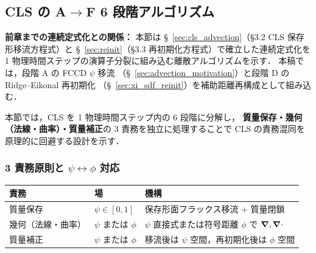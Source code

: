 %
%
\subsection{\texorpdfstring{CLS の A$\to$F 6 段階アルゴリズム}{CLS の A→F 6 段階アルゴリズム}}
\label{sec:cls_stages}

\noindent\textbf{前章までの連続定式化との関係：}
本節は §~\ref{sec:cls_advection}（§3.2 CLS 保存形移流方程式）と
§~\ref{sec:reinit}（§3.3 再初期化方程式）で確立した連続定式化を
1 物理時間ステップの演算子分裂に組み込む離散アルゴリズムを示す．
本稿では，段階 A の FCCD $\psi$ 移流
（§~\ref{sec:advection_motivation}）と段階 D の Ridge--Eikonal 再初期化
（§~\ref{sec:xi_sdf_reinit}）を補助距離再構成として組み込む．

本節では，CLS \cite{OlssonKreiss2005} を 1 物理時間ステップ内の
6 段階に分解し，
\textbf{質量保存・幾何（法線・曲率）・質量補正}の
3 責務を独立に処理することで
CLS の責務混同を原理的に回避する設計を示す．

\subsubsection{\texorpdfstring{3 責務原則と $\psi\leftrightarrow\phi$ 対応}{3 責務原則と ψ↔φ 対応}}
\label{sec:cls_three_responsibilities}

\begin{center}
\begin{tabular}{@{}lll@{}}
\hline
責務 & 場 & 機構 \\
\hline
質量保存 & $\psi\in[0,1]$ & 保存形面フラックス移流 + 質量閉鎖 \\
幾何（法線・曲率）& $\psi$ または $\phi$ & $\psi$ 直接式または符号距離 $\phi$ で $\bm{\nabla},\bm{\nabla}\cdot$ \\
質量補正 & $\psi$ または $\phi$ & 移流後は $\psi$ 空間，再初期化後は $\phi$ 空間 \\
\hline
\end{tabular}
\end{center}

